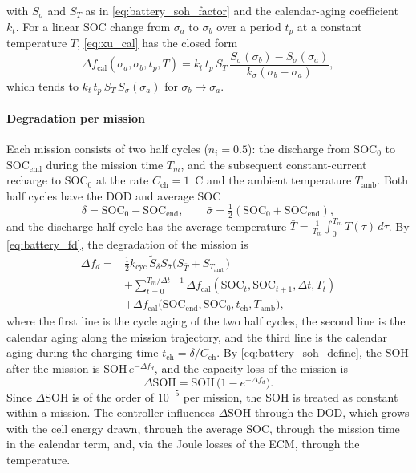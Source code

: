 with $S_\sigma$ and $S_T$ as in \eqref{eq:battery_soh_factor} and the calendar-aging coefficient $k_t$.
For a linear \ac{SOC} change from $\sigma_a$ to $\sigma_b$ over a period $t_p$ at a constant
temperature $T$, \eqref{eq:xu_cal} has the closed form
\begin{equation}
  \Delta f_{\mathrm{cal}}(\sigma_a, \sigma_b, t_p, T)
  = k_t\, t_p\, S_T\, \frac{S_\sigma(\sigma_b) - S_\sigma(\sigma_a)}{k_\sigma(\sigma_b - \sigma_a)},
  \label{eq:xu_cal_lin}
\end{equation}
which tends to $k_t\, t_p\, S_T\, S_\sigma(\sigma_a)$ for $\sigma_b \to \sigma_a$.

\paragraph{Degradation per mission}
Each mission consists of two half cycles ($n_i = 0.5$): the discharge from $\mathrm{SOC}_0$ to
$\mathrm{SOC}_{\mathrm{end}}$ during the mission time $T_m$, and the subsequent constant-current
recharge to $\mathrm{SOC}_0$ at the rate $C_{\mathrm{ch}} = 1$~C and the ambient temperature
$T_{\mathrm{amb}}$. Both half cycles have the \ac{DOD} and average \ac{SOC}
\begin{equation}
  \delta = \mathrm{SOC}_0 - \mathrm{SOC}_{\mathrm{end}},\qquad
  \bar\sigma = \tfrac{1}{2}(\mathrm{SOC}_0 + \mathrm{SOC}_{\mathrm{end}}),
  \label{eq:cycle_stats}
\end{equation}
and the discharge half cycle has the average temperature
$\bar T = \frac{1}{T_m}\int_0^{T_m} T(\tau)\, d\tau$. By \eqref{eq:battery_fd}, the degradation of
the mission is
\begin{equation}
\begin{aligned}
  \Delta f_d = {} & \tfrac{1}{2} k_{\mathrm{cyc}}\, \widetilde{S}_{\delta} S_{\bar\sigma}
      \big(S_{\bar T} + S_{T_{\mathrm{amb}}}\big) \\
    & + \sum_{t=0}^{T_m/\Delta t - 1} \Delta f_{\mathrm{cal}}(\mathrm{SOC}_t, \mathrm{SOC}_{t+1}, \Delta t, T_t) \\
    & + \Delta f_{\mathrm{cal}}\big(\mathrm{SOC}_{\mathrm{end}}, \mathrm{SOC}_0, t_{\mathrm{ch}}, T_{\mathrm{amb}}\big),
\end{aligned}
  \label{eq:fd_mission}
\end{equation}
where the first line is the cycle aging of the two half cycles, the second line is the calendar
aging along the mission trajectory, and the third line is the calendar aging during the charging
time $t_{\mathrm{ch}} = \delta / C_{\mathrm{ch}}$. By \eqref{eq:battery_soh_define}, the \ac{SOH}
after the mission is $\mathrm{SOH}\,e^{-\Delta f_d}$, and the capacity loss of the mission is
\begin{equation}
  \Delta\mathrm{SOH} = \mathrm{SOH}\,\big(1 - e^{-\Delta f_d}\big).
  \label{eq:dsoh}
\end{equation}
Since $\Delta\mathrm{SOH}$ is of the order of $10^{-5}$ per mission, the \ac{SOH} is treated as
constant within a mission. The controller influences $\Delta\mathrm{SOH}$ through the \ac{DOD},
which grows with the cell energy drawn, through the average \ac{SOC}, through the mission time in the
calendar term, and, via the Joule losses of the \ac{ECM}, through the temperature.


